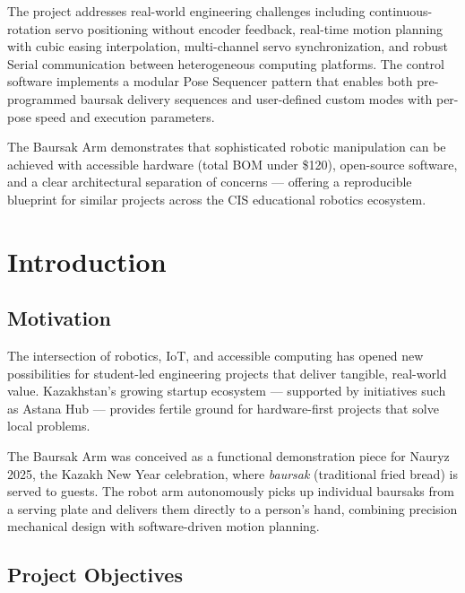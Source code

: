 \documentclass[12pt,a4paper]{article}
\begin{document}
The project addresses real-world engineering challenges including continuous-rotation servo positioning without encoder feedback, real-time motion planning with cubic easing interpolation, multi-channel servo synchronization, and robust Serial communication between heterogeneous computing platforms. The control software implements a modular Pose Sequencer pattern that enables both pre-programmed baursak delivery sequences and user-defined custom modes with per-pose speed and execution parameters.

The Baursak Arm demonstrates that sophisticated robotic manipulation can be achieved with accessible hardware (total BOM under \$120), open-source software, and a clear architectural separation of concerns --- offering a reproducible blueprint for similar projects across the CIS educational robotics ecosystem.

\section{Introduction}

\subsection{Motivation}

The intersection of robotics, IoT, and accessible computing has opened new possibilities for student-led engineering projects that deliver tangible, real-world value. Kazakhstan's growing startup ecosystem --- supported by initiatives such as Astana Hub --- provides fertile ground for hardware-first projects that solve local problems.

The Baursak Arm was conceived as a functional demonstration piece for Nauryz 2025, the Kazakh New Year celebration, where \textit{baursak} (traditional fried bread) is served to guests. The robot arm autonomously picks up individual baursaks from a serving plate and delivers them directly to a person's hand, combining precision mechanical design with software-driven motion planning.

\subsection{Project Objectives}
\end{document}

